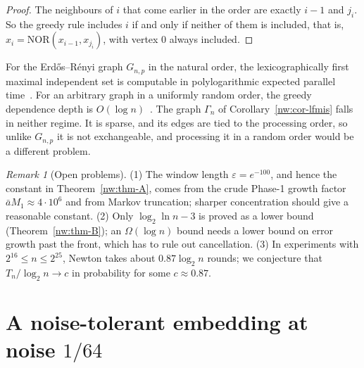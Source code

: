 \documentclass[11pt]{amsart}
\theoremstyle{definition}
\theoremstyle{remark}
\newtheorem{remark}[theorem]{Remark}
\newcommand{\eps}{\varepsilon}
\newcommand{\NOR}{\mathrm{NOR}}
\begin{document}
\begin{proof}
The neighbours of $i$ that come earlier in the order are exactly $i-1$ and
$j_i$. So the greedy rule includes $i$ if and only if neither of them is
included, that is, $x_i=\NOR(x_{i-1},x_{j_i})$, with vertex $0$ always
included.
\end{proof}

For the Erd\H{o}s--R\'enyi graph $G_{n,p}$ in the natural order, the
lexicographically first maximal independent set is computable in
polylogarithmic expected parallel time~\cite{nw-crt87,nw-cf90}. For an
arbitrary graph in a uniformly random order, the greedy dependence depth is
$O(\log n)$~\cite{nw-bfs12,nw-fn18}. The graph $\Gamma_n$ of
Corollary~\ref{nw:cor-lfmis} falls in neither regime. It is sparse, and its
edges are tied to the processing order, so unlike $G_{n,p}$ it is not
exchangeable, and processing it in a random order would be a different
problem.

\begin{remark}[Open problems]\label{nw:rem-open}
(1) The window length $\eps=e^{-100}$, and hence the constant in
Theorem~\ref{nw:thm-A}, comes from the crude Phase-1 growth factor
$\bar aM_1\approx4\cdot10^6$ and from Markov truncation; sharper concentration
should give a reasonable constant. (2) Only $\log_2\ln n-3$ is proved as a
lower bound (Theorem~\ref{nw:thm-B}); an $\Omega(\log n)$ bound needs a lower
bound on error growth past the front, which has to rule out cancellation.
(3) In experiments with $2^{16}\le n\le2^{25}$, Newton takes about
$0.87\log_2n$ rounds; we conjecture that $T_n/\log_2n\to c$ in probability
for some $c\approx0.87$.
\end{remark}

\providecommand{\cG}{\mathcal{G}}
\providecommand{\Bin}{\operatorname{Bin}}

\section{A noise-tolerant embedding at noise \texorpdfstring{$1/64$}{1/64}}\label{sec:gapbase}
\end{document}
